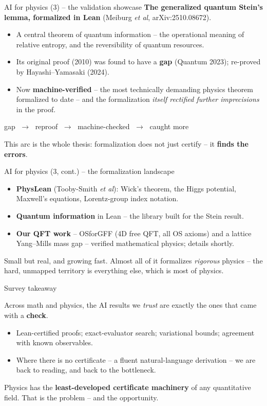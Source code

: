 \documentclass[aspectratio=169,xcolor=dvipsnames]{beamer}
\begin{document}
\begin{frame}{AI for physics (3) -- the validation showcase}
\textbf{The generalized quantum Stein's lemma, formalized in Lean}
(Meiburg \emph{et al}, arXiv:2510.08672).
\begin{itemize}
  \item A central theorem of quantum information -- the operational meaning of relative
        entropy, and the reversibility of quantum resources.
  \item Its original proof (2010) was found to have a \textbf{gap} (Quantum 2023);
        re-proved by Hayashi--Yamasaki (2024).
  \item Now \textbf{machine-verified} -- the most technically demanding physics theorem
        formalized to date -- and the formalization \emph{itself rectified further
        imprecisions} in the proof.
\end{itemize} \pause
\bigskip
\begin{center}
\large gap $\;\to\;$ reproof $\;\to\;$ machine-checked $\;\to\;$ caught more
\end{center}
\smallskip
This arc is the whole thesis: formalization does not just certify -- it \textbf{finds the errors}.
\end{frame}

\begin{frame}{AI for physics (3, cont.) -- the formalization landscape}
\begin{itemize}
  \item \textbf{PhysLean} (Tooby-Smith \emph{et al}): Wick's theorem, the Higgs potential,
        Maxwell's equations, Lorentz-group index notation.
  \item \textbf{Quantum information} in Lean -- the library built for the Stein result.
  \item \textbf{Our QFT work} -- OSforGFF (4D free QFT, all OS axioms) and a lattice
        Yang--Mills mass gap -- verified mathematical physics; details shortly.
\end{itemize} \pause
\smallskip
Small but real, and growing fast.  Almost all of it formalizes \emph{rigorous} physics --
the hard, unmapped territory is everything else, which is most of physics.
\end{frame}

\begin{frame}{Survey takeaway}
\begin{block}{}
Across math and physics, the AI results we \emph{trust} are exactly the ones that
came with a \textbf{check}.
\end{block} \pause
\begin{itemize}
  \item Lean-certified proofs; exact-evaluator search; variational bounds; agreement with
        known observables.
  \item Where there is no certificate -- a fluent natural-language derivation -- we are back
        to reading, and back to the bottleneck.
\end{itemize} \pause
\smallskip
Physics has the \textbf{least-developed certificate machinery} of any quantitative field.
That is the problem -- and the opportunity.
\end{frame}
\end{document}
